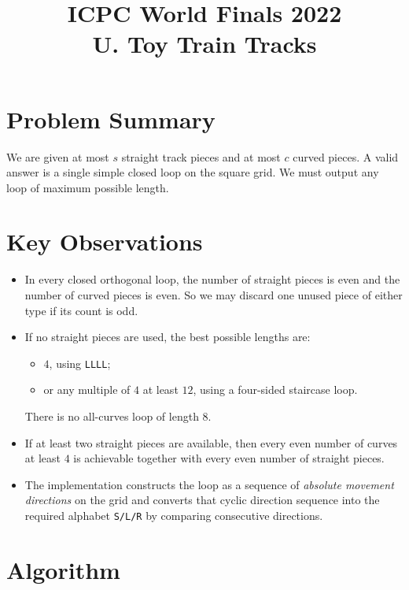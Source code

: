 \documentclass[11pt]{article}
\title{ICPC World Finals 2022\\U. Toy Train Tracks}
\author{}
\date{}
\begin{document}
\maketitle

\section*{Problem Summary}

We are given at most $s$ straight track pieces and at most $c$ curved pieces. A valid answer is a single
simple closed loop on the square grid. We must output any loop of maximum possible length.

\section*{Key Observations}

\begin{itemize}[leftmargin=*]
    \item In every closed orthogonal loop, the number of straight pieces is even and the number of curved
    pieces is even. So we may discard one unused piece of either type if its count is odd.
    \item If no straight pieces are used, the best possible lengths are:
    \begin{itemize}[leftmargin=*]
        \item $4$, using \texttt{LLLL};
        \item or any multiple of $4$ at least $12$, using a four-sided staircase loop.
    \end{itemize}
    There is no all-curves loop of length $8$.
    \item If at least two straight pieces are available, then every even number of curves at least $4$ is
    achievable together with every even number of straight pieces.
    \item The implementation constructs the loop as a sequence of \emph{absolute movement directions} on
    the grid and converts that cyclic direction sequence into the required alphabet
    \texttt{S/L/R} by comparing consecutive directions.
\end{itemize}

\section*{Algorithm}
\end{document}
